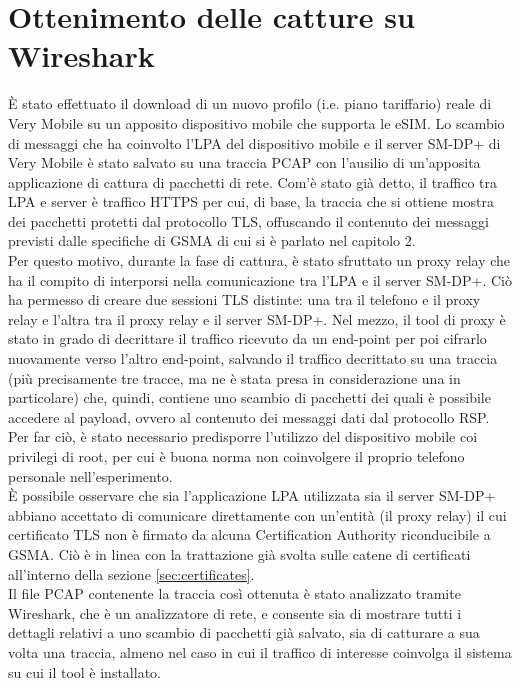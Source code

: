 \documentclass[10pt, oneside]{book}
\begin{document}
\section{Ottenimento delle catture su Wireshark}\label{sec:wireshark}
È stato effettuato il download di un nuovo profilo (i.e. piano tariffario) reale di Very Mobile su un apposito dispositivo mobile che supporta le eSIM. Lo scambio di messaggi che ha coinvolto l'LPA del dispositivo mobile e il server SM-DP+ di Very Mobile è stato salvato su una traccia PCAP con l'ausilio di un'apposita applicazione di cattura di pacchetti di rete. Com'è stato già detto, il traffico tra LPA e server è traffico HTTPS per cui, di base, la traccia che si ottiene mostra dei pacchetti protetti dal protocollo TLS, offuscando il contenuto dei messaggi previsti dalle specifiche di GSMA di cui si è parlato nel capitolo 2.\\
Per questo motivo, durante la fase di cattura, è stato sfruttato un proxy relay che ha il compito di interporsi nella comunicazione tra l'LPA e il server SM-DP+. Ciò ha permesso di creare due sessioni TLS distinte: una tra il telefono e il proxy relay e l'altra tra il proxy relay e il server SM-DP+. Nel mezzo, il tool di proxy è stato in grado di decrittare il traffico ricevuto da un end-point per poi cifrarlo nuovamente verso l'altro end-point, salvando il traffico decrittato su una traccia (più precisamente tre tracce, ma ne è stata presa in considerazione una in particolare) che, quindi, contiene uno scambio di pacchetti dei quali è possibile accedere al payload, ovvero al contenuto dei messaggi dati dal protocollo RSP. Per far ciò, è stato necessario predisporre l'utilizzo del dispositivo mobile coi privilegi di root, per cui è buona norma non coinvolgere il proprio telefono personale nell'esperimento.\\
È possibile osservare che sia l'applicazione LPA utilizzata sia il server SM-DP+ abbiano accettato di comunicare direttamente con un'entità (il proxy relay) il cui certificato TLS non è firmato da alcuna Certification Authority riconducibile a GSMA. Ciò è in linea con la trattazione già svolta sulle catene di certificati all'interno della sezione \ref{sec:certificates}.\\
Il file PCAP contenente la traccia così ottenuta è stato analizzato tramite Wireshark, che è un analizzatore di rete, e consente sia di mostrare tutti i dettagli relativi a uno scambio di pacchetti già salvato, sia di catturare a sua volta una traccia, almeno nel caso in cui il traffico di interesse coinvolga il sistema su cui il tool è installato.
\end{document}
